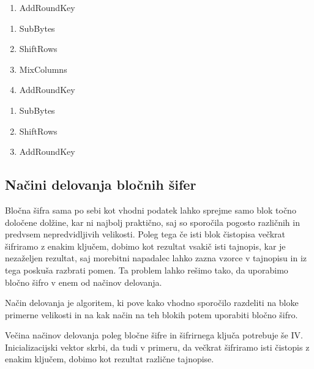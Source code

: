 \documentclass[12pt,a4paper,openany]{book}
\begin{document}
\begin{description}[style=nextline]
	\item[KeyExpansions]
	\item[Prvi krog]
		\begin{enumerate}
			\item AddRoundKey
		\end{enumerate}
	\item[Vmesni krogi]
		\begin{enumerate}
			\item SubBytes
			\item ShiftRows
			\item MixColumns
			\item AddRoundKey
		\end{enumerate}
	\item[Zadnji krogi]
		\begin{enumerate}
			\item SubBytes
			\item ShiftRows
			\item AddRoundKey
		\end{enumerate}

\end{description}



\subsection{Načini delovanja bločnih šifer}

Bločna šifra sama po sebi kot vhodni podatek lahko sprejme samo blok točno določene dolžine, kar ni najbolj praktično, saj so sporočila pogosto različnih in predvsem nepredvidljivih velikosti. Poleg tega če isti blok čistopisa večkrat šifriramo z enakim ključem, dobimo kot rezultat vsakič isti tajnopis, kar je nezaželjen rezultat, saj morebitni napadalec lahko zazna vzorce v tajnopisu in iz tega poskuša razbrati pomen. Ta problem lahko rešimo tako, da uporabimo bločno šifro v enem od načinov delovanja.

Način delovanja je algoritem, ki pove kako vhodno sporočilo razdeliti na bloke primerne velikosti in na kak način na teh blokih potem uporabiti bločno šifro.

Večina načinov delovanja poleg bločne šifre in šifrirnega ključa potrebuje še \gls{IV}. Inicializacijski vektor skrbi, da tudi v primeru, da večkrat šifriramo isti čistopis z enakim ključem, dobimo kot rezultat različne tajnopise.
\end{document}
